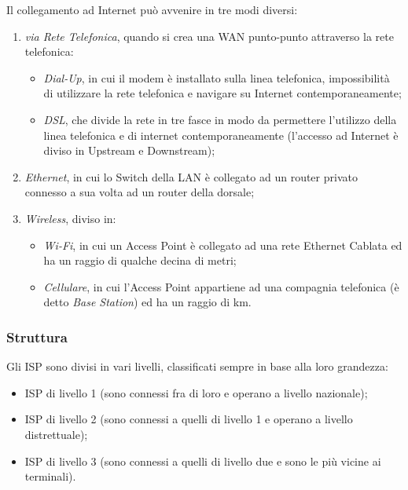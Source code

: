 \documentclass[a4paper]{article}
\begin{document}
			Il collegamento ad Internet può avvenire in tre modi diversi:
			\begin{enumerate}
				\item \emph{via Rete Telefonica}, quando si crea una WAN punto-punto attraverso la rete telefonica:
					\begin{itemize}
						\item \emph{Dial-Up}, in cui il modem è installato sulla linea telefonica, impossibilità di utilizzare la rete telefonica e navigare su Internet contemporaneamente;
					  	\item \emph{DSL}, che divide la rete in tre fasce in modo da permettere l'utilizzo della linea telefonica e di internet contemporaneamente (l'accesso ad Internet è diviso in Upstream e Downstream);
					\end{itemize}
				\item \emph{Ethernet}, in cui lo Switch della LAN è collegato ad un router privato connesso a sua volta ad un router della dorsale;
				\item \emph{Wireless}, diviso in:
					\begin{itemize}
						\item \emph{Wi-Fi}, in cui un Access Point è collegato ad una rete Ethernet Cablata ed ha un raggio di qualche decina di metri;
						\item \emph{Cellulare}, in cui l'Access Point appartiene ad una compagnia telefonica (è detto \emph{Base Station}) ed ha un raggio di km.
					\end{itemize}
			\end{enumerate}
			
		\newpage
		\subsubsection{Struttura}
		
			Gli ISP sono divisi in vari livelli, classificati sempre in base alla loro grandezza:
			\begin{itemize}
				\item ISP di livello 1 (sono connessi fra di loro e operano a livello nazionale);
				\item ISP di livello 2 (sono connessi a quelli di livello 1 e operano a livello distrettuale);
				\item ISP di livello 3 (sono connessi a quelli di livello due e sono le più vicine ai terminali).\newline
			\end{itemize}
			
\end{document}
